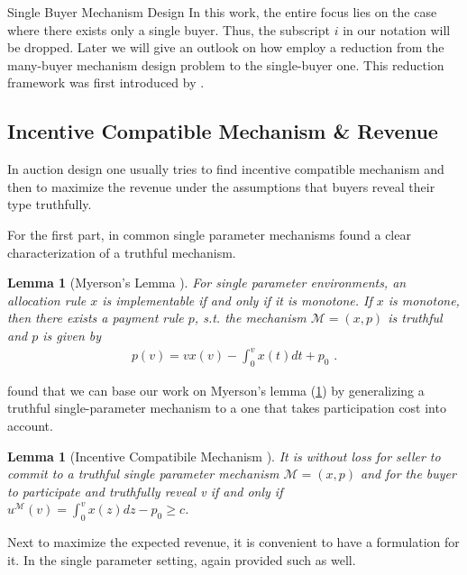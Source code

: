 \documentclass[11pt,a4paper]{article}
\newtheorem{lemma}[theorem]{Lemma}
\newcommand{\1}[1]{\mbox{\rm\bf 1}_{#1}}
\newcommand{\eqdot}{\text{ .}}
\begin{document}
\begin{section}{Single Buyer Mechanism Design}
 In this work, the entire focus lies on the case where there exists only a single buyer.
 Thus, the subscript $i$ in our notation will be dropped.
 Later we will give an outlook on how \citet{primary} employ a reduction from the many-buyer mechanism design problem to the single-buyer one.
 This reduction framework was first introduced by \citet{alaei2012bayesian,alaei2014bayesian}.

 \subsection{Incentive Compatible Mechanism \& Revenue}
 \label{sec:incentive-comptaible-mechanism-revenue}
 In auction design one usually tries to find incentive compatible mechanism and then to maximize the revenue under the assumptions that buyers reveal their type truthfully.

 For the first part, in common single parameter mechanisms \citet{myerson} found a clear characterization of a truthful mechanism.

 \begin{lemma}[Myerson's Lemma \cite{myerson}]
     \label{lemma:myersons-lemma}
     For single parameter environments, an allocation rule $x$ is implementable if and only if it is monotone.
     If $x$ is monotone, then there exists a payment rule $p$, s.t. the mechanism $\mathcal{M}=(x,p)$ is truthful
     and $p$ is given by
     \begin{align*}
         p(v) = v x(v) - \int_0^v x(t) dt + p_0 \eqdot
     \end{align*}
 \end{lemma}

 \citet{primary} found that we can base our work on Myerson's lemma (\ref{lemma:myersons-lemma})
 by generalizing a truthful single-parameter mechanism to a one that takes participation cost into account.

 \begin{lemma}[Incentive Compatibile Mechanism \cite{primary}]
     \label{lemma:thruthful-mechanism}
     It is without loss for seller to commit to a truthful single parameter mechanism $\mathcal{M}=(x,p)$ and
     for the buyer to participate and truthfully reveal v if and only if $u^\mathcal{M}(v) = \int_0^v x(z)dz - p_0 \geq c$.
 \end{lemma}

 Next to maximize the expected revenue, it is convenient to have a formulation for it.
 In the single parameter setting, again \citet{myerson} provided such as well.


\end{section}
\end{document}
